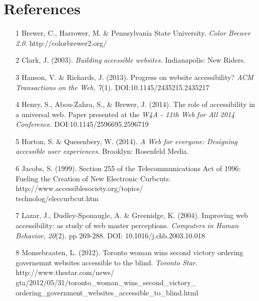 \documentclass{acm_proc_article-sp}
\begin{document}
\section{References}
\begin{itemize}
\item[1] Brewer, C., Harrower, M. \& Pennsylvania State University. {\it Color Brewer 2.0}. http://colorbrewer2.org/
\item[2] Clark, J. (2003). {\it Building accessible websites.} Indianapolis: New Riders.
\item[3] Hanson, V. \& Richards, J. (2013). Progress on website accessibility? {\it ACM Transactions on the Web, 7}(1). DOI:10.1145/2435215.2435217 
\item[4] Henry, S., Abou-Zahra, S., \& Brewer, J. (2014). The role of accessibility in a universal web. Paper presented at the {\it W4A - 11th Web for All 2014 Conference}. DOI:10.1145/2596695.2596719
\item[5] Horton, S. \& Quesenbery, W. (2014). {\it A Web for everyone: Designing accessible user experiences.} Brooklyn: Rosenfeld Media.
\item[6] Jacobs, S. (1999). Section 255 of the Telecommunications Act of 1996: Fueling the Creation of New Electronic Curbcuts. http://www.accessiblesociety.org/topics/\\technolog/eleccurbcut.htm 
\item[7] Lazar, J., Dudley-Sponaugle, A. \& Greenidge, K. (2004). Improving web accessibility: as study of web master perceptions. {\it Computers in Human Behavior, 20}(2). pp 269-288. DOI: 10.1016/j.chb.2003.10.018 
\item[8] Monsebraaten, L. (2012). Toronto woman wins second victory ordering governemnt websites accessible to the blind. {\it Toronto Star}. http://www.thestar.com/news/\\gta/2012/05/31/toronto\_woman\_wins\_second\_victory\_\\ordering\_government\_websites\_accessible\_to\_blind.html

\end{itemize}
\end{document}
